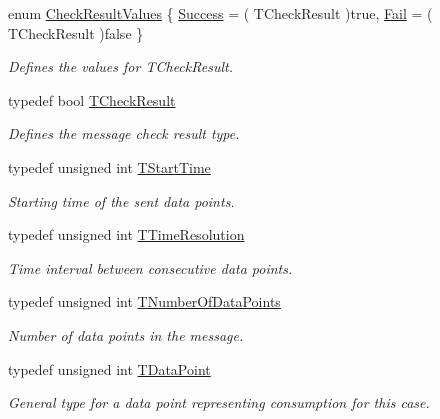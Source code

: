 \begin{DoxyCompactItemize}
\item 
enum \hyperlink{class_terra_swarm_1_1_asynchronous_1_1_client_data_a4af3124197d375d54989d28c2703dc9f}{Check\-Result\-Values} \{ \hyperlink{class_terra_swarm_1_1_asynchronous_1_1_client_data_a4af3124197d375d54989d28c2703dc9fab47acf016a2a1f12737512d9ee7102a0}{Success} = ( T\-Check\-Result )true, 
\hyperlink{class_terra_swarm_1_1_asynchronous_1_1_client_data_a4af3124197d375d54989d28c2703dc9fa89702b1843b2d2547e4da97c3adca3d0}{Fail} = ( T\-Check\-Result )false
 \}
\begin{DoxyCompactList}\small\item\em Defines the values for T\-Check\-Result. \end{DoxyCompactList}\item 
typedef bool \hyperlink{class_terra_swarm_1_1_asynchronous_1_1_client_data_a91575e9105c574792d5216d40f1c89de}{T\-Check\-Result}
\begin{DoxyCompactList}\small\item\em Defines the message check result type. \end{DoxyCompactList}\item 
typedef unsigned int \hyperlink{class_terra_swarm_1_1_asynchronous_1_1_client_data_a70b07646d3a13d9c2cb16ade44a49966}{T\-Start\-Time}
\begin{DoxyCompactList}\small\item\em Starting time of the sent data points. \end{DoxyCompactList}\item 
typedef unsigned int \hyperlink{class_terra_swarm_1_1_asynchronous_1_1_client_data_a626a7d114c405bceb24262253fe36c71}{T\-Time\-Resolution}
\begin{DoxyCompactList}\small\item\em Time interval between consecutive data points. \end{DoxyCompactList}\item 
typedef unsigned int \hyperlink{class_terra_swarm_1_1_asynchronous_1_1_client_data_a690994afd0ba9b8eeb56ae679a5c64e8}{T\-Number\-Of\-Data\-Points}
\begin{DoxyCompactList}\small\item\em Number of data points in the message. \end{DoxyCompactList}\item 
typedef unsigned int \hyperlink{class_terra_swarm_1_1_asynchronous_1_1_client_data_ac733720fed15e940f991de44f1bb514e}{T\-Data\-Point}
\begin{DoxyCompactList}\small\item\em General type for a data point representing consumption for this case. \end{DoxyCompactList}\end{DoxyCompactItemize}
